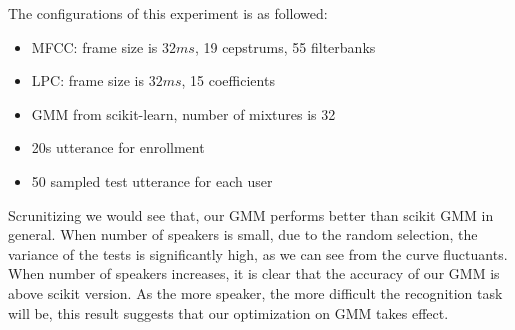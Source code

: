 The configurations of this experiment is as followed:
\begin{itemize}
  \item MFCC: frame size is $32 ms $, 19 cepstrums, 55 filterbanks
  \item LPC: frame size is $32 ms $, 15 coefficients
  \item GMM from scikit-learn, number of mixtures is 32
  \item 20s utterance for enrollment
  \item 50 sampled test utterance for each user
\end{itemize}


Scrunitizing  we would see that, our GMM performs better than
scikit GMM in general. When number of speakers is small, due to the random
selection, the variance of the tests is significantly high, as we can see from the curve fluctuants.
When number of speakers increases, it is clear that the
accuracy of our GMM is above scikit version. As the more speaker, the more
difficult the recognition task will be, this result suggests that our
optimization on GMM takes effect.


